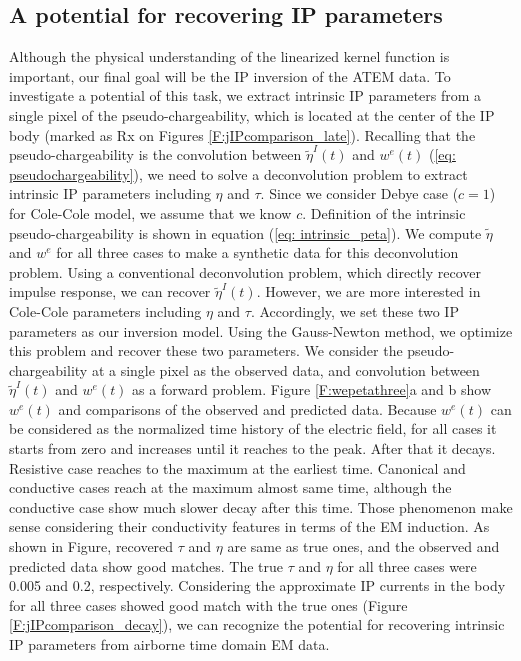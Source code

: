 \documentclass[a4paper, 11pt]{article}
\newcommand{\peta}{\tilde{\eta}}
\begin{document}
\subsection{A potential for recovering IP parameters}

Although the physical understanding of the linearized kernel function is important, our final goal will be the IP inversion of the ATEM data. To investigate a potential of this task, we extract intrinsic IP parameters from a single pixel of the pseudo-chargeability, which is located at the center of the IP body (marked as Rx on Figures \ref{F:jIPcomparison_late}). Recalling that the pseudo-chargeability is the convolution between $\peta^{I}(t)$ and $w^{e}(t)$ (\ref{eq: pseudochargeability}), we need to solve a deconvolution problem to extract intrinsic IP parameters including $\eta$ and $\tau$. Since we consider Debye case ($c=1$) for Cole-Cole model, we assume that we know $c$. Definition of the intrinsic pseudo-chargeability is shown in equation (\ref{eq: intrinsic_peta}). We compute $\peta$ and $w^e$ for all three cases to make a synthetic data for this deconvolution problem. Using a conventional deconvolution problem, which directly recover impulse response, we can recover $\peta^{I}(t)$. However, we are more interested in Cole-Cole parameters including $\eta$ and $\tau$. Accordingly, we set these two IP parameters as our inversion model. Using the Gauss-Newton method, we optimize this problem and recover these two parameters. We consider the pseudo-chargeability at a single pixel as the observed data, and convolution between $\peta^{I}(t)$ and $w^e(t)$ as a forward problem. Figure \ref{F:wepetathree}a and b show $w^e(t)$ and comparisons of the observed and predicted data. Because $w^e(t)$ can be considered as the normalized time history of the electric field, for all cases it starts from zero and increases until it reaches to the peak.  After that it decays. Resistive case reaches to the maximum at the earliest time. Canonical and conductive cases reach at the maximum almost same time, although the conductive case show much slower decay after this time. Those phenomenon make sense considering their conductivity features in terms of the EM induction. As shown in Figure, recovered $\tau$ and $\eta$ are same as true ones, and the observed and predicted data show good matches. The true $\tau$ and $\eta$ for all three cases were 0.005 and 0.2, respectively. Considering the approximate IP currents in the body for all three cases showed good match with the true ones (Figure \ref{F:jIPcomparison_decay}), we can recognize the potential for recovering intrinsic IP parameters from airborne time domain EM data. 
\end{document}
